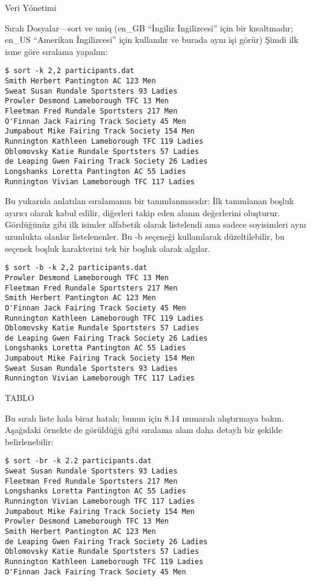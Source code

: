 \begin{section}{Veri Yönetimi}
\begin{subsection}{Sıralı Dosyalar—sort ve uniq}
(en\_GB “İngiliz İngilizcesi” için bir kısaltmadır; en\_US “Amerikan İngilizcesi” için kullanılır ve burada aynı işi görür) Şimdi ilk isme göre sıralama yapalım: 
\begin{verbatim}
$ sort -k 2,2 participants.dat
Smith Herbert Pantington AC 123 Men
Sweat Susan Rundale Sportsters 93 Ladies
Prowler Desmond Lameborough TFC 13 Men
Fleetman Fred Rundale Sportsters 217 Men
O'Finnan Jack Fairing Track Society 45 Men
Jumpabout Mike Fairing Track Society 154 Men
Runnington Kathleen Lameborough TFC 119 Ladies
Oblomovsky Katie Rundale Sportsters 57 Ladies
de Leaping Gwen Fairing Track Society 26 Ladies
Longshanks Loretta Pantington AC 55 Ladies
Runnington Vivian Lameborough TFC 117 Ladies
\end{verbatim}

Bu yukarıda anlatılan sıralamanın bir tanımlanmasıdır: İlk tanımlanan boşluk ayırıcı olarak kabul edilir, diğerleri takip eden alanın değerlerini oluşturur. Gördüğünüz gibi ilk isimler alfabetik olarak listelendi ama sadece soyisimleri aynı uzunlukta olanlar listelenenler. Bu -b seçeneği kullanılarak düzeltilebilir, bu seçenek boşluk karakterini tek bir boşluk olarak algılar.
\begin{verbatim}
$ sort -b -k 2,2 participants.dat
Prowler Desmond Lameborough TFC 13 Men
Fleetman Fred Rundale Sportsters 217 Men
Smith Herbert Pantington AC 123 Men
O'Finnan Jack Fairing Track Society 45 Men
Runnington Kathleen Lameborough TFC 119 Ladies
Oblomovsky Katie Rundale Sportsters 57 Ladies
de Leaping Gwen Fairing Track Society 26 Ladies
Longshanks Loretta Pantington AC 55 Ladies
Jumpabout Mike Fairing Track Society 154 Men
Sweat Susan Rundale Sportsters 93 Ladies
Runnington Vivian Lameborough TFC 117 Ladies
\end{verbatim}

TABLO

Bu sıralı liste hala biraz hatalı; bunun için 8.14 numaralı alıştırmaya bakın. 
Aşağıdaki örnekte de görüldüğü gibi sıralama alanı daha detaylı bir şekilde belirlenebilir:
\begin{verbatim}
$ sort -br -k 2.2 participants.dat
Sweat Susan Rundale Sportsters 93 Ladies
Fleetman Fred Rundale Sportsters 217 Men
Longshanks Loretta Pantington AC 55 Ladies
Runnington Vivian Lameborough TFC 117 Ladies
Jumpabout Mike Fairing Track Society 154 Men
Prowler Desmond Lameborough TFC 13 Men
Smith Herbert Pantington AC 123 Men
de Leaping Gwen Fairing Track Society 26 Ladies
Oblomovsky Katie Rundale Sportsters 57 Ladies
Runnington Kathleen Lameborough TFC 119 Ladies
O'Finnan Jack Fairing Track Society 45 Men
\end{verbatim}


\end{subsection}
\end{section}
